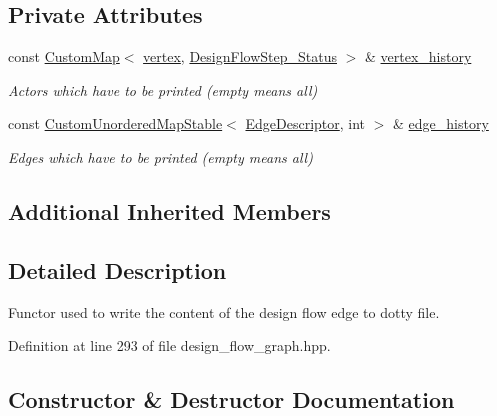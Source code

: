 \subsection*{Private Attributes}
\begin{DoxyCompactItemize}
\item 
const \hyperlink{custom__map_8hpp_a18ca01763abbe3e5623223bfe5aaac6b}{Custom\+Map}$<$ \hyperlink{graph_8hpp_abefdcf0544e601805af44eca032cca14}{vertex}, \hyperlink{design__flow__step_8hpp_afb1f0d73069c26076b8d31dbc8ebecdf}{Design\+Flow\+Step\+\_\+\+Status} $>$ \& \hyperlink{classDesignFlowEdgeWriter_a3e839beeb21940663760c1b2c076f4d2}{vertex\+\_\+history}
\begin{DoxyCompactList}\small\item\em Actors which have to be printed (empty means all) \end{DoxyCompactList}\item 
const \hyperlink{custom__map_8hpp_a7314a7df1cdb3a3acf478ab86e95c226}{Custom\+Unordered\+Map\+Stable}$<$ \hyperlink{graph_8hpp_a9eb9afea34e09f484b21f2efd263dd48}{Edge\+Descriptor}, int $>$ \& \hyperlink{classDesignFlowEdgeWriter_a2b7e72d6aa6ed86b52d6b5d47cb6828a}{edge\+\_\+history}
\begin{DoxyCompactList}\small\item\em Edges which have to be printed (empty means all) \end{DoxyCompactList}\end{DoxyCompactItemize}
\subsection*{Additional Inherited Members}


\subsection{Detailed Description}
Functor used to write the content of the design flow edge to dotty file. 

Definition at line 293 of file design\+\_\+flow\+\_\+graph.\+hpp.



\subsection{Constructor \& Destructor Documentation}
\mbox{\label{classDesignFlowEdgeWriter_a3cdba4165ae8567ef5f98e632c9b03af}} 
